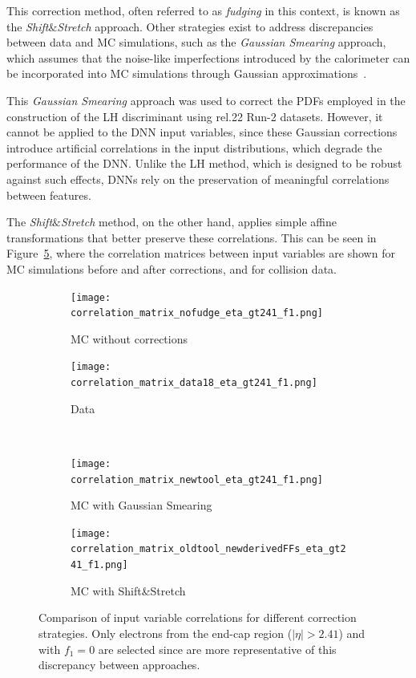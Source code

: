This correction method, often referred to as \textit{fudging} in this context, is known as the \textit{Shift}$\&$\textit{Stretch} approach. Other strategies exist to address discrepancies between data and MC simulations, such as the \textit{Gaussian Smearing} approach, which assumes that the noise-like imperfections introduced by the calorimeter can be incorporated into MC simulations through Gaussian approximations~\cite{Puddefoot:2797826}.

This \textit{Gaussian Smearing} approach was used to correct the PDFs employed in the construction of the LH discriminant using rel.22 Run-2 datasets. However, it cannot be applied to the DNN input variables, since these Gaussian corrections introduce artificial correlations in the input distributions, which degrade the performance of the DNN. Unlike the LH method, which is designed to be robust against such effects, DNNs rely on the preservation of meaningful correlations between features.

The \textit{Shift}$\&$\textit{Stretch} method, on the other hand, applies simple affine transformations that better preserve these correlations. This can be seen in Figure~\ref{fig:correlations}, where the correlation matrices between input variables are shown for MC simulations before and after corrections, and for collision data.

\begin{figure}[h]
  \centering
  \begin{subfigure}[b]{0.49\textwidth}
      \centering
      \texttt{[image: correlation\_matrix\_nofudge\_eta\_gt241\_f1.png]}
      \caption{MC without corrections}
      \label{fig:corr_nominal}
  \end{subfigure}
  \hfill
  \begin{subfigure}[b]{0.49\textwidth}
      \centering
      \texttt{[image: correlation\_matrix\_data18\_eta\_gt241\_f1.png]}
      \caption{Data}
      \label{fig:corr_data}
  \end{subfigure}
  \\
  \vspace{0.4cm}
  \begin{subfigure}[b]{0.49\textwidth}
      \centering
      \texttt{[image: correlation\_matrix\_newtool\_eta\_gt241\_f1.png]}
      \caption{MC with Gaussian Smearing}
      \label{fig:corr_smearing}
  \end{subfigure}
  \hfill
  \begin{subfigure}[b]{0.49\textwidth}
      \centering
      \texttt{[image: correlation\_matrix\_oldtool\_newderivedFFs\_eta\_gt241\_f1.png]}
      \caption{MC with Shift\&Stretch}
      \label{fig:corr_shiftstretch}
  \end{subfigure}
  \caption{Comparison of input variable correlations for different correction strategies. Only electrons from the end-cap region ($|\eta|>2.41$) and with $f_{1}=0$ are selected since are more representative of this discrepancy between approaches.}
  \label{fig:correlations}
\end{figure}

